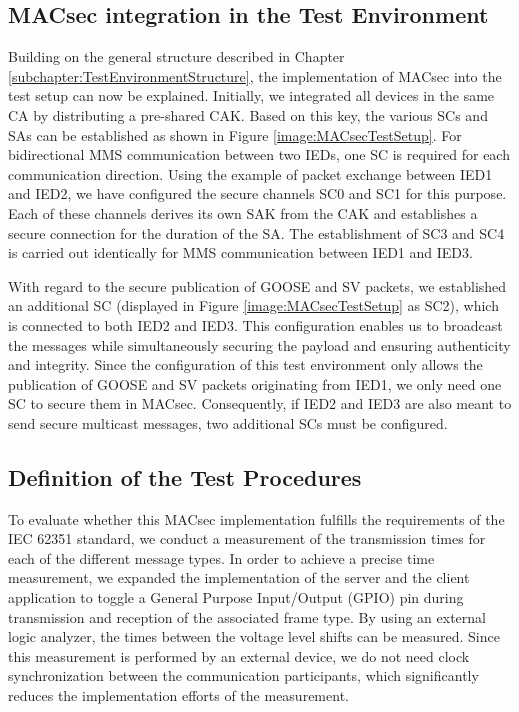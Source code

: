 \documentclass[conference, onecolumn, a4paper]{IEEEtran}
\begin{document}
\subsection{MACsec integration in the Test Environment}
\label{subchapter:TestEnvironmentMACsec}
\noindent Building on the general structure described in Chapter \ref{subchapter:TestEnvironmentStructure}, the implementation of MACsec into the test 
setup can now be explained. Initially, we integrated all devices in the same CA by distributing a pre-shared CAK. Based on this key, the various SCs and 
SAs can be established as shown in Figure \ref{image:MACsecTestSetup}. For bidirectional MMS communication between two IEDs, one SC is required for each 
communication direction. Using the example of packet exchange between IED1 and IED2, we have configured the secure channels SC0 and SC1 for this purpose. 
Each of these channels derives its own SAK from the CAK and establishes a secure connection for the duration of the SA. The establishment of SC3 and SC4 
is carried out identically for MMS communication between IED1 and IED3.

\smallskip
With regard to the secure publication of GOOSE and SV packets, we established an additional SC (displayed in Figure \ref{image:MACsecTestSetup} as SC2), 
which is connected to both IED2 and IED3. This configuration enables us to broadcast the messages while simultaneously securing the payload and ensuring 
authenticity and integrity. Since the configuration of this test environment only allows the publication of GOOSE and SV packets originating from IED1, we 
only need one SC to secure them in MACsec. Consequently, if IED2 and IED3 are also meant to send secure multicast messages, two additional SCs must be 
configured.   

\subsection{Definition of the Test Procedures}
\label{subchapter:TestProcedures}
\noindent To evaluate whether this MACsec implementation fulfills the requirements of the IEC 62351 standard, we conduct a measurement of the 
transmission times for each of the different message types. In order to achieve a precise time measurement, we expanded the implementation of the server 
and the client application to toggle a General Purpose Input/Output (GPIO) pin during transmission and reception of the associated frame type. 
By using an external logic analyzer, the times between the voltage level shifts can be measured. Since this measurement is performed by an external device, 
we do not need clock synchronization between the communication participants, which significantly reduces the implementation efforts of the measurement. 
\end{document}
